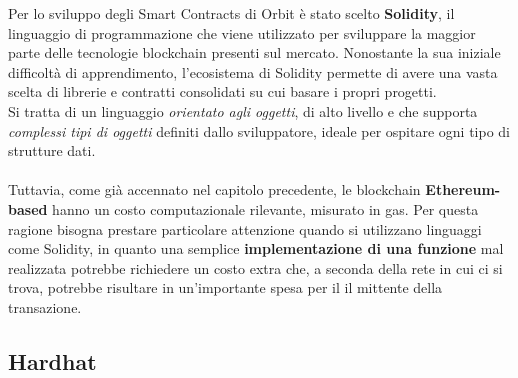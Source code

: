 \documentclass[12pt,a4paper]{report}
\begin{document}
Per lo sviluppo degli Smart Contracts di Orbit è stato scelto \textbf{Solidity}\cite{solidty}, il linguaggio di programmazione che viene utilizzato per sviluppare la maggior parte delle tecnologie blockchain presenti sul mercato. Nonostante la sua iniziale difficoltà di apprendimento, l'ecosistema di Solidity permette di avere una vasta scelta di librerie e contratti consolidati su cui basare i propri progetti.
\\Si tratta di un linguaggio \textit{orientato agli oggetti}, di alto livello e che supporta \textit{complessi tipi di oggetti} definiti dallo sviluppatore, ideale per ospitare ogni tipo di strutture dati.
\\\\Tuttavia, come già accennato nel capitolo precedente, le blockchain \textbf{Ethereum-based} hanno un costo computazionale rilevante, misurato in gas. Per questa ragione bisogna prestare particolare attenzione quando si utilizzano linguaggi come Solidity, in quanto una semplice \textbf{implementazione di una funzione} mal realizzata potrebbe richiedere un costo extra che, a seconda della rete in cui ci si trova, potrebbe risultare in un'importante spesa per il il mittente della transazione.

\subsection{Hardhat}
\end{document}
